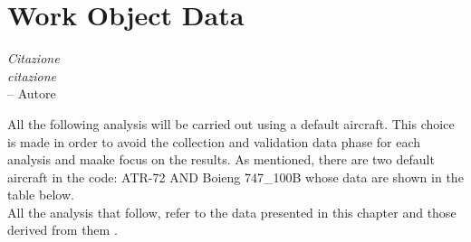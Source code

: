 \chapter{Work Object Data}
\label{ch:workobject}

\begin{flushright}
	{\smaller
		\textit{Citazione\\ citazione}\\
		-- Autore}
\end{flushright}

All the following analysis will be carried out using a default aircraft. This choice is made in order to avoid the collection and validation data phase for each analysis and maake focus on the results. As mentioned, there are two default aircraft in the code: ATR-72 AND Boieng 747\_100B whose data are shown in the table below.\\
All the analysis that follow, refer to the data presented in this chapter and those derived from them .

